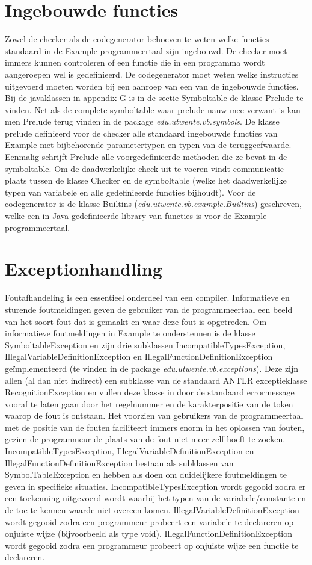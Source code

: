 \section{Ingebouwde functies}
Zowel de checker als de codegenerator behoeven te weten welke functies standaard in de Example programmeertaal zijn ingebouwd. De checker moet immers kunnen controleren of een functie die in een programma wordt aangeroepen wel is gedefinieerd. De codegenerator moet weten welke instructies uitgevoerd moeten worden bij een aanroep van een van de ingebouwde functies. Bij de javaklassen in appendix G is in de sectie Symboltable de klasse Prelude te vinden. Net als de complete symboltable waar prelude nauw mee verwant is kan men Prelude terug vinden in de package \emph{edu.utwente.vb.symbols}. De klasse prelude definieerd voor de checker alle standaard ingebouwde functies van Example met bijbehorende parametertypen en typen van de teruggeefwaarde. Eenmalig schrijft Prelude alle voorgedefinieerde methoden die ze bevat in de symboltable. Om de daadwerkelijke check uit te voeren vindt communicatie plaats tussen de klasse Checker en de symboltable (welke het daadwerkelijke typen van variabele en alle gedefinieerde functies bijhoudt). Voor de codegenerator is de klasse Builtins (\emph{edu.utwente.vb.example.Builtins}) geschreven, welke een in Java gedefinieerde library van functies is voor de Example programmeertaal.

\section{Exceptionhandling}
Foutafhandeling is een essentieel onderdeel van een compiler. Informatieve en sturende foutmeldingen geven de gebruiker van de programmeertaal een beeld van het soort fout dat is gemaakt en waar deze fout is opgetreden. Om informatieve foutmeldingen in Example te ondersteunen is de klasse SymboltableException en zijn drie subklassen IncompatibleTypesException, IllegalVariableDefinitionException en IllegalFunctionDefinitionException ge\"{i}mplementeerd (te vinden in de package \emph{edu.utwente.vb.exceptions}). Deze zijn allen (al dan niet indirect) een subklasse van de standaard ANTLR exceptieklasse RecognitionException en vullen deze klasse in door de standaard errormessage vooraf te laten gaan door het regelnummer en de karakterpositie van de token waarop de fout is ontstaan. Het voorzien van gebruikers van de programmeertaal met de positie van de fouten faciliteert immers enorm in het oplossen van fouten, gezien de programmeur de plaats van de fout niet meer zelf hoeft te zoeken.
IncompatibleTypesException, IllegalVariableDefinitionException en IllegalFunctionDefinitionException bestaan als subklassen van SymbolTableException en hebben als doen om duidelijkere foutmeldingen te geven in specifieke situaties. IncompatibleTypesException wordt gegooid zodra er een toekenning uitgevoerd wordt waarbij het typen van de variabele/constante en de toe te kennen waarde niet overeen komen.
IllegalVariableDefinitionException wordt gegooid zodra een programmeur probeert een variabele te declareren op onjuiste wijze (bijvoorbeeld als type void). IllegalFunctionDefinitionException wordt gegooid zodra een programmeur probeert op onjuiste wijze een functie te declareren.

